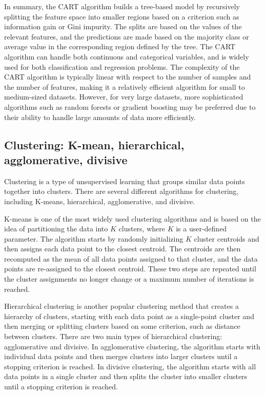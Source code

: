 \documentclass[12pt, a4paper, oneside]{article}
\begin{document}
In summary, the CART algorithm builds a tree-based model by recursively splitting the feature space into smaller regions based on a criterion such as information gain or Gini impurity. The splits are based on the values of the relevant features, and the predictions are made based on the majority class or average value in the
corresponding region defined by the tree. The CART algorithm can handle both continuous and categorical variables, and is widely used for both classification and regression problems. The complexity of the CART algorithm is typically linear with respect to the number of samples and the number of features, making it a relatively efficient algorithm for small to medium-sized datasets. However, for very large datasets, more sophisticated algorithms such as random forests or gradient boosting may be preferred due to their ability to handle large amounts of data more efficiently.






\subsection{ Clustering: K-mean, hierarchical, agglomerative, divisive }

Clustering is a type of unsupervised learning that groups similar data points together into clusters. There are several different algorithms for clustering, including K-means, hierarchical, agglomerative, and divisive.

K-means is one of the most widely used clustering algorithms and is based on the idea of partitioning the data into $K$ clusters, where $K$ is a user-defined parameter. The algorithm starts by randomly initializing $K$ cluster centroids and then assigns each data point to the closest centroid. The centroids are then recomputed as the mean of all data points assigned to that cluster, and the data points are re-assigned to the closest centroid. These two steps are repeated until the cluster assignments no longer change or a maximum number of iterations is reached.

Hierarchical clustering is another popular clustering method that creates a hierarchy of clusters, starting with each data point as a single-point cluster and then merging or splitting clusters based on some criterion, such as distance between clusters. There are two main types of hierarchical clustering: agglomerative and divisive. In agglomerative clustering, the algorithm starts with individual data points and then merges clusters into larger clusters until a stopping criterion is reached. In divisive clustering, the algorithm starts with all data points in a single cluster and then splits the cluster into smaller clusters until a stopping criterion is reached.
\end{document}
